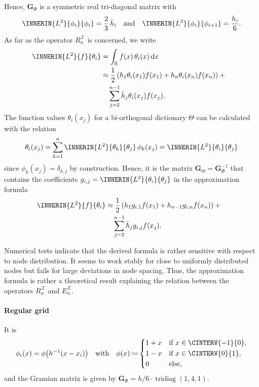\documentclass[a4paper]{paper}
\newcommand*{\SPC}[1]{{\ensuremath{\mathscr{#1}}}}
\newcommand{\RR}{{\ensuremath{\mathbb{R}}}}
\newcommand*{\EXT}[2]{\ensuremath{E_{#1}^{#2}}}
\newcommand*{\REST}[2]{\ensuremath{R_{#1}^{#2}}}
\newcommand*{\RnX}{{\ensuremath{\REST{n}{\SPC{X}}}}}
\newcommand*{\EnX}{{\ensuremath{\EXT{n}{\SPC{X}}}}}
\DeclareMathOperator{\TRIDIAG}{{tridiag}}
\DeclareMathOperator{\DEFEQ}{{\coloneqq}}
\newcommand*{\D}{{\ensuremath{\mathrm{d}}}}
\newcommand*{\BDG}{\boldsymbol{G}}
\begin{document}
Hence, $\BDG_\Phi$ is a symmetric real tri-diagonal matrix with
%
\begin{equation*}
 \INNERIN{L^2}{\phi_i}{\phi_i} = \frac{2}{3}\, \bar h_i
 \quad \text{and} \quad
 \INNERIN{L^2}{\phi_i}{\phi_{i+1}} = \frac{h_i}{6}.
\end{equation*}
%
As far as the operator $\RnX$ is concerned, we write
%
\begin{align*}
 \INNERIN{L^2}{f}{\theta_i}
 &= \int_\RR f(x)\, \theta_i(x)\, \D x \\
 & \approx \frac{1}{2}\left(
 h_1 \theta_i(x_1) f(x_1) + h_n \theta_i(x_n) f(x_n)  
 \right) + \phantom{x} \\
 &\hspace{10pt} \sum_{j=2}^{n-1} \bar h_j \theta_i(x_j) f(x_j).
\end{align*}
%
The function values $\theta_i(x_j)$ for a bi-orthogonal dictionary $\Theta$ can be calculated with the 
relation
%
\begin{equation*}
 \theta_i(x_j) 
 = \sum_{k=1}^n \INNERIN{L^2}{\theta_k}{\theta_j}\, \phi_k(x_j)
 = \INNERIN{L^2}{\theta_i}{\theta_j}
\end{equation*}
%
since $\phi_k(x_j) = \delta_{k,j}$ by construction. Hence, it is the matrix $\BDG_\Theta = 
\BDG_\Phi^{-1}$ 
that contains the coefficients $g_{i,j} = \INNERIN{L^2}{\theta_i}{\theta_j}$ in the approximation formula
%
\begin{align*}
 \INNERIN{L^2}{f}{\theta_i}
 & \approx \frac{1}{2}\left(
 h_1 g_{i,1} f(x_1) + h_{n-1} g_{i,n} f(x_n)  
 \right) + \phantom{x} \\
 &\hspace{10pt} \sum_{j=2}^{n-1} \bar h_j g_{i,j} f(x_j).
\end{align*}

\begin{remark}
 Numerical tests indicate that the derived formula is rather sensitive with respect to node distribution. It seems to 
 work stably for close to uniformly distributed nodes but fails for large deviations in node spacing. Thus, the 
 approximation formula is rather a theoretical result explaining the relation between the operators $\RnX$ and $\EnX$.
\end{remark}

\paragraph{Regular grid}

It is
%
\begin{equation*}
 \phi_i(x) = \phi\big( h^{-1}(x-x_i) \big)
 \quad \text{with} \quad
 \phi(x) \DEFEQ
 \begin{dcases}
  1 + x & \text{if } x \in \CINTERV{-1}{0}, \\
  1-x & \text{if } x \in \CINTERV{0}{1}, \\
  0 & \text{else},
 \end{dcases}
\end{equation*}
%
and the Gramian matrix is given by $\BDG_\Phi = h/6\cdot \TRIDIAG(1,4,1)$.
%
\end{document}
